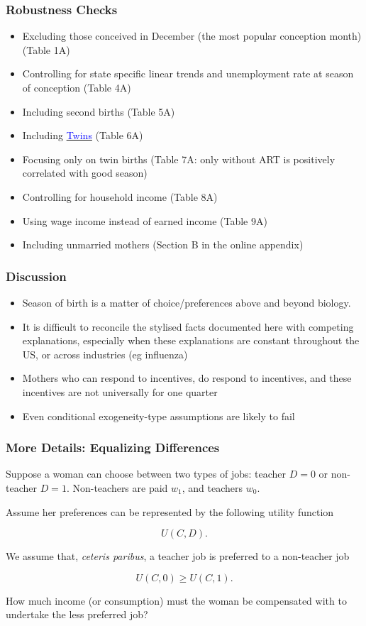 \documentclass[10pt,letterpaper,subeqn]{beamer}
\begin{document}
\begin{frame}
\hypertarget{robustness}{}
\frametitle{Robustness Checks}
\begin{itemize}
\item Excluding those conceived in December (the most popular conception month) (Table 1A)
\item Controlling for state specific linear trends and unemployment rate at season of conception (Table 4A)
\item Including second births (Table 5A)
\item Including \hyperlink{twins}{\textcolor{blue}{Twins}} (Table 6A)
\item Focusing only on twin births (Table 7A: only without ART is positively correlated with good season)
\item Controlling for household income (Table 8A)
\item Using wage income instead of earned income (Table 9A)
\item Including unmarried mothers (Section B in the online appendix)
\end{itemize}
\end{frame}



\begin{frame}
\frametitle{Discussion}
\begin{itemize}
\item Season of birth is a matter of choice/preferences above and beyond biology.
\item It is difficult to reconcile the stylised facts documented here with competing explanations, especially when these explanations are constant throughout the US, or across industries (eg influenza)
\item Mothers who can respond to incentives, do respond to incentives, and these incentives are not universally for one quarter
\item Even conditional exogeneity-type assumptions are likely to fail
\end{itemize}
\end{frame}



\begin{frame}
  \frametitle{More Details: Equalizing Differences}
  Suppose a woman can choose between two types of jobs: teacher $D=0$ or non-teacher $D=1$. Non-teachers are paid $w_1$, and teachers $w_0$.
  \vspace{2mm}
  
  Assume her preferences can be represented by the following utility function

  \[
    U(C,D).
  \]

  We assume that, \emph{ceteris paribus}, a teacher job is preferred to a non-teacher job

  \[
    U(C,0) \geq U(C,1).
  \]

  How much income (or consumption) must the woman be compensated with to undertake the less preferred job?
\end{frame}
\end{document}
